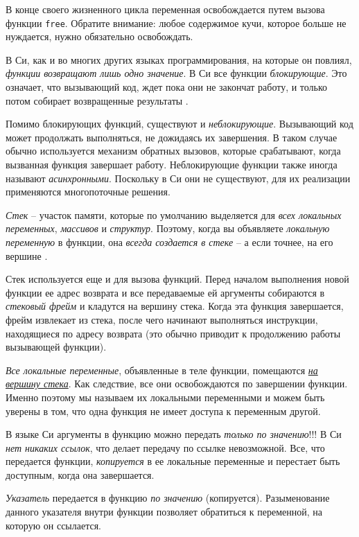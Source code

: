 \documentclass[%
	11pt,
	a4paper,
	utf8,
		]{article}
\begin{document}
В конце своего жизненного цикла переменная освобождается путем вызова функции \verb|free|. Обратите внимание: любое содержимое кучи, которое больше не нуждается, нужно обязательно освобождать.

В Си, как и во многих других языках программирования, на которые он повлиял, \emph{функции возвращают лишь одно значение}. В Си все функции \emph{блокирующие}. Это означает, что вызывающий код, ждет пока они не закончат работу, и только потом собирает возвращенные результаты \cite[]{amini-extreme-c:2022}.

Помимо блокирующих функций, существуют и \emph{неблокирующие}. Вызывающий код может продолжать выполняться, не дожидаясь их завершения. В таком случае обычно используется механизм обратных вызовов, которые срабатывают, когда вызванная функция завершает работу. Неблокирующие функции также иногда называют \emph{асинхронными}. Поскольку в Си они не существуют, для их реализации применяются многопоточные решения.

\emph{Стек} -- участок памяти, которые по умолчанию выделяется для \emph{всех локальных переменных}, \emph{массивов} и \emph{структур}. Поэтому, когда вы объявляете \emph{локальную переменную} в функции, она \emph{\color{blue}всегда создается в стеке} -- а если точнее, на его вершине \cite[]{amini-extreme-c:2022}.

Стек используется еще и для вызова функций. Перед началом выполнения новой функции ее адрес возврата и все передаваемые ей аргументы собираются в \emph{стековый фрейм} и кладутся на вершину стека. Когда эта функция завершается, фрейм извлекает из стека, после чего начинают выполняться инструкции, находящиеся по адресу возврата (это обычно приводит к продолжению работы вызывающей функции).

\emph{Все локальные переменные}, объявленные в теле функции, помещаются \underline{\itshape на вершину стека}. Как следствие, все они освобождаются по завершении функции. Именно поэтому мы называем их локальными переменными и можем быть уверены в том, что одна функция не имеет доступа к переменным другой.

В языке Си аргументы в функцию можно передать \emph{только по значению}!!! В Си \emph{нет никаких ссылок}, что делает передачу по ссылке невозможной. {\color{blue}Все, что передается функции, \emph{копируется} в ее локальные переменные и перестает быть доступным, когда она завершается.} \cite[]{amini-extreme-c:2022}

\emph{Указатель} передается в функцию \emph{по значению} (копируется). Разыменование данного указателя внутри функции позволяет обратиться к переменной, на которую он ссылается.
\end{document}

